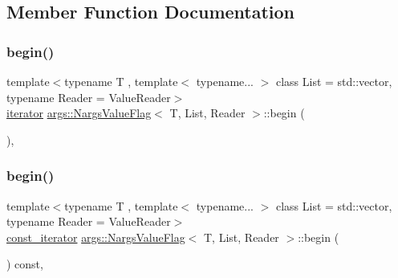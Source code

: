 \subsection{Member Function Documentation}
\mbox{\label{classargs_1_1_nargs_value_flag_af41b80e20350b97458e4584136311508}} 
\subsubsection{\texorpdfstring{begin()}{begin()}\hspace{0.1cm}{\footnotesize\ttfamily [1/2]}}
{\footnotesize\ttfamily template$<$typename T , template$<$ typename... $>$ class List = std\+::vector, typename Reader  = Value\+Reader$>$ \\
\hyperlink{classargs_1_1_nargs_value_flag_aeaf17e645a109333204dcb7c954a2473}{iterator} \hyperlink{classargs_1_1_nargs_value_flag}{args\+::\+Nargs\+Value\+Flag}$<$ T, List, Reader $>$\+::begin (\begin{DoxyParamCaption}{ }\end{DoxyParamCaption})\hspace{0.3cm}{\ttfamily [inline]}, {\ttfamily [noexcept]}}

\mbox{\label{classargs_1_1_nargs_value_flag_a72e0031c35bacf86616f1516a1be6fa4}} 
\subsubsection{\texorpdfstring{begin()}{begin()}\hspace{0.1cm}{\footnotesize\ttfamily [2/2]}}
{\footnotesize\ttfamily template$<$typename T , template$<$ typename... $>$ class List = std\+::vector, typename Reader  = Value\+Reader$>$ \\
\hyperlink{classargs_1_1_nargs_value_flag_a115760faf263d007148b30c99d8e6bdc}{const\+\_\+iterator} \hyperlink{classargs_1_1_nargs_value_flag}{args\+::\+Nargs\+Value\+Flag}$<$ T, List, Reader $>$\+::begin (\begin{DoxyParamCaption}{ }\end{DoxyParamCaption}) const\hspace{0.3cm}{\ttfamily [inline]}, {\ttfamily [noexcept]}}

